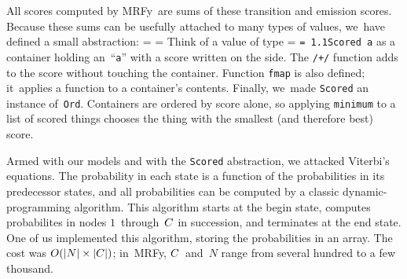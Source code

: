 \documentclass[]{jfp1}
\makeatletter
\newcommand\mrfy{MRFy} %
\newcommand\alignwidth{\ensuremath C} %
\newcommand\seclabel[1]{\label{sec:#1}}
\newif\ifverbatimsmall
\newcommand{\mono}[1]{%
  {\@tempdima = \fontdimen2\font
   \texttt{\spaceskip = 1.1\@tempdima #1}}}
\newcommand\smallverbatiminput[1]{%
  \verbatimsmalltrue
  \presvtopsep=\topsep
  \topsep=0.78\topsep
  \verbatimsmallfalse
  \topsep=\presvtopsep
}
\newcommand\smallfuzzverbatiminput[2]{%
  \hfuzz=#1 \smallverbatiminput{#2}\hfuzz=0pt }
\makeatother
\begin{document}

All scores computed by \mrfy\ are sums of these transition and
emission scores.
Because these sums can be usefully attached to many types of values,
we~have defined a small abstraction:
\smallfuzzverbatiminput{10.8pt}{vscore}
Think of a value of type \mono{Scored~a} as a container holding
 an~``\texttt a'' with a score written on the side.
The \texttt{/+/} function adds to the score without touching the
 container.
Function \texttt{fmap} is also defined; it~applies a function to a
 container's contents. 
%
Finally, we~made \texttt{Scored} an instance of~\texttt{Ord}.
Containers are ordered by score alone, so applying
\texttt{minimum} to a list of scored things chooses the thing with the
smallest (and therefore best) score.


Armed with our models and with the \texttt{Scored} abstraction, we
attacked Viterbi's equations. 
The probability in each state is a function of the probabilities
in its predecessor states, 
and all probabilities can be computed by a classic dynamic-programming
algorithm.
This algorithm starts at the {begin} state,
computes probabilites in nodes $1$~through~$\alignwidth$ in
succession, and terminates at the {end} state.
One of us implemented this algorithm, storing the probabilities in an array.
The cost was
$O(|N|\times|\alignwidth|)$;
in~MRFy, $\alignwidth$~and~$N$ range from several hundred to a few
thousand.





\seclabel{cons}
\seclabel{vee-prime}
\end{document}
